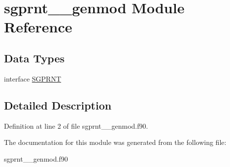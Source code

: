 \hypertarget{classsgprnt____genmod}{\section{sgprnt\+\_\+\+\_\+genmod Module Reference}
\label{classsgprnt____genmod}
}
\subsection*{Data Types}
\begin{DoxyCompactItemize}
\item 
interface \hyperlink{interfacesgprnt____genmod_1_1_s_g_p_r_n_t}{S\+G\+P\+R\+N\+T}
\end{DoxyCompactItemize}


\subsection{Detailed Description}


Definition at line 2 of file sgprnt\+\_\+\+\_\+genmod.\+f90.



The documentation for this module was generated from the following file\+:\begin{DoxyCompactItemize}
\item 
sgprnt\+\_\+\+\_\+genmod.\+f90\end{DoxyCompactItemize}
